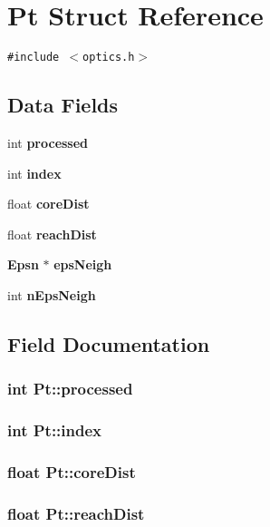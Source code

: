 \section{Pt Struct Reference}
\label{structPt}
{\tt \#include $<$optics.h$>$}

\subsection*{Data Fields}
\begin{CompactItemize}
\item 
int {\bf processed}
\item 
int {\bf index}
\item 
float {\bf coreDist}
\item 
float {\bf reachDist}
\item 
{\bf Epsn} $\ast$ {\bf epsNeigh}
\item 
int {\bf nEpsNeigh}
\end{CompactItemize}


\subsection{Field Documentation}
\subsubsection{\setlength{\rightskip}{0pt plus 5cm}int {\bf Pt::processed}}\label{structPt_72ddf42cfbe92a7c8579a8d85264aeb3}


\subsubsection{\setlength{\rightskip}{0pt plus 5cm}int {\bf Pt::index}}\label{structPt_335815634513915555d5d2e45efd3a5f}


\subsubsection{\setlength{\rightskip}{0pt plus 5cm}float {\bf Pt::coreDist}}\label{structPt_ba9a827ad04c5bcf0395de27a0493b9d}


\subsubsection{\setlength{\rightskip}{0pt plus 5cm}float {\bf Pt::reachDist}}\label{structPt_5dc6fc7601f055a4ca9f65f9844cde8c}



